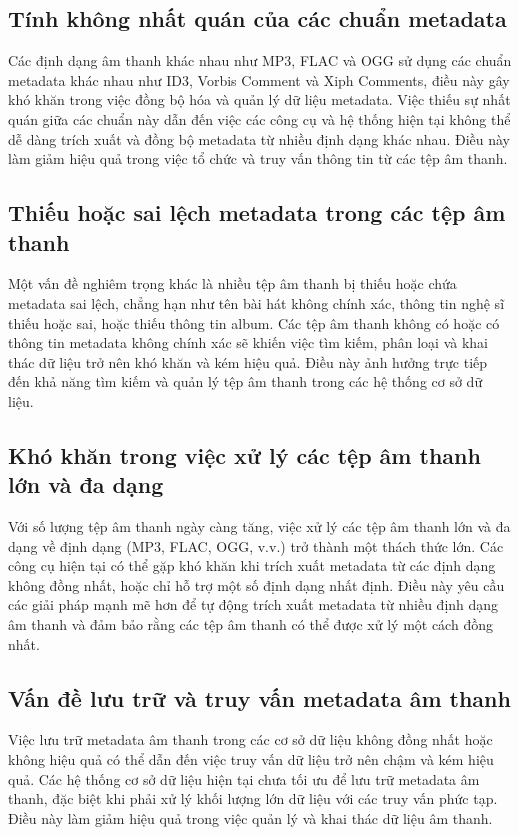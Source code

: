 \documentclass[conference]{IEEEtran}
\begin{document}
\subsection{Tính không nhất quán của các chuẩn metadata}

Các định dạng âm thanh khác nhau như MP3, FLAC và OGG sử dụng các chuẩn metadata khác nhau như ID3,
Vorbis Comment và Xiph Comments, điều này gây khó khăn trong việc đồng bộ hóa và quản lý dữ liệu metadata. 
Việc thiếu sự nhất quán giữa các chuẩn này dẫn đến việc các công cụ và hệ thống hiện tại không thể dễ dàng trích xuất
 và đồng bộ metadata từ nhiều định dạng khác nhau. Điều này làm giảm hiệu quả trong việc tổ chức và truy vấn thông tin từ các tệp âm thanh.

\subsection{Thiếu hoặc sai lệch metadata trong các tệp âm thanh}

Một vấn đề nghiêm trọng khác là nhiều tệp âm thanh bị thiếu hoặc chứa metadata sai lệch, 
chẳng hạn như tên bài hát không chính xác, thông tin nghệ sĩ thiếu hoặc sai, hoặc thiếu thông tin album. 
Các tệp âm thanh không có hoặc có thông tin metadata không chính xác sẽ khiến việc tìm kiếm, phân loại 
và khai thác dữ liệu trở nên khó khăn và kém hiệu quả. Điều này ảnh hưởng trực tiếp đến khả năng tìm kiếm
 và quản lý tệp âm thanh trong các hệ thống cơ sở dữ liệu.

\subsection{Khó khăn trong việc xử lý các tệp âm thanh lớn và đa dạng}

Với số lượng tệp âm thanh ngày càng tăng, việc xử lý các tệp âm thanh lớn và đa dạng về định dạng (MP3, FLAC, OGG, v.v.) 
trở thành một thách thức lớn. Các công cụ hiện tại có thể gặp khó khăn khi trích xuất metadata từ các định dạng không đồng nhất, 
hoặc chỉ hỗ trợ một số định dạng nhất định. Điều này yêu cầu các giải pháp mạnh mẽ hơn để tự động trích xuất metadata
từ nhiều định dạng âm thanh và đảm bảo rằng các tệp âm thanh có thể được xử lý một cách đồng nhất.

\subsection{Vấn đề lưu trữ và truy vấn metadata âm thanh}

Việc lưu trữ metadata âm thanh trong các cơ sở dữ liệu không đồng nhất hoặc không hiệu quả có thể dẫn đến việc truy vấn dữ liệu
 trở nên chậm và kém hiệu quả. Các hệ thống cơ sở dữ liệu hiện tại chưa tối ưu để lưu trữ metadata âm thanh, 
 đặc biệt khi phải xử lý khối lượng lớn dữ liệu với các truy vấn phức tạp. 
 Điều này làm giảm hiệu quả trong việc quản lý và khai thác dữ liệu âm thanh.
\end{document}
